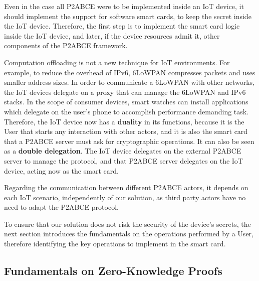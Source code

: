 Even in the case all P2ABCE were to be implemented inside an IoT device, it should implement the support for software smart cards, to keep the secret inside the IoT device. Therefore, the first step is to implement the smart card logic inside the IoT device, and later, if the device resources admit it, other components of the P2ABCE framework.

Computation offloading is not a new technique for IoT environments. For example, to reduce the overhead of IPv6, 6LoWPAN compresses packets and uses smaller address sizes. In order to communicate a 6LoWPAN with other networks, the IoT devices delegate on a proxy that can manage the 6LoWPAN and IPv6 stacks. In the scope of consumer devices, smart watches can install applications which delegate on the user's phone to accomplish performance demanding task. 
Therefore, the IoT device now has a \textbf{duality} in its functions, because it is the User that starts any interaction with other actors, and it is also the smart card that a P2ABCE server must ask for cryptographic operations. It can also be seen as a \textbf{double delegation}. The IoT device delegates on the external P2ABCE server to manage the protocol, and that P2ABCE server delegates on the IoT device, acting now as the smart card.

Regarding the communication between different P2ABCE actors, it depends on each IoT scenario, independently of our solution, as third party actors have no need to adapt the P2ABCE protocol.







To ensure that our solution does not risk the security of the device's secrets, the next section introduces the fundamentals on the operations performed by a User, therefore identifying the key operations to implement in the smart card.

\subsection{Fundamentals on Zero-Knowledge Proofs}

